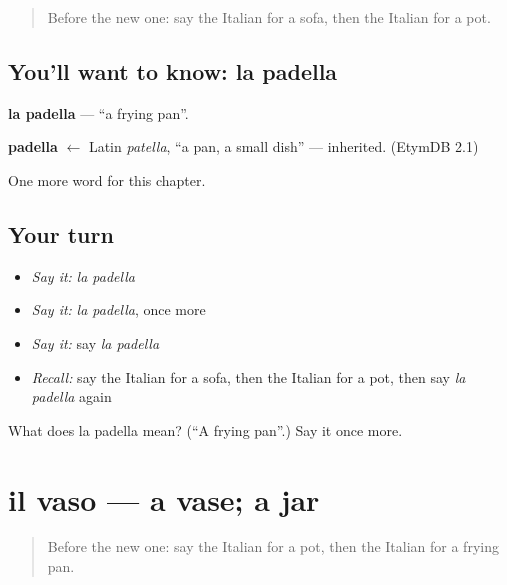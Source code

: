 \label{lesson:IT-C98-padella}



\begin{quote}
Before the new one: say the Italian for a sofa, then the Italian for a pot.
\end{quote}

\subsection*{You'll want to know: la padella}
\textbf{la padella} — \textquotedblleft{}a frying pan\textquotedblright{}.

\begin{cousinweb}
\textbf{padella} $\leftarrow$ Latin \emph{patella}, \textquotedblleft{}a pan, a small dish\textquotedblright{} — inherited. (EtymDB 2.1)
\end{cousinweb}

\begin{grammarlens}[title={What you've built}]
One more word for this chapter.
\end{grammarlens}

\subsection*{Your turn}
\begin{itemize}
\raggedright
  \item \emph{Say it:} \emph{la padella}
  \item \emph{Say it:} \emph{la padella}, once more
  \item \emph{Say it:} say \emph{la padella}
  \item \emph{Recall:} say the Italian for a sofa, then the Italian for a pot, then say \emph{la padella} again
\end{itemize}

\begin{tcolorbox}[breakable,colback=teal!4,colframe=teal!35!black,title={Before you move on}]
What does la padella mean? (\textquotedblleft{}A frying pan\textquotedblright{}.) Say it once more.
\end{tcolorbox}
\section[il vaso]{il vaso — a vase; a jar}

\label{lesson:IT-C98-vaso}



\begin{quote}
Before the new one: say the Italian for a pot, then the Italian for a frying pan.
\end{quote}

